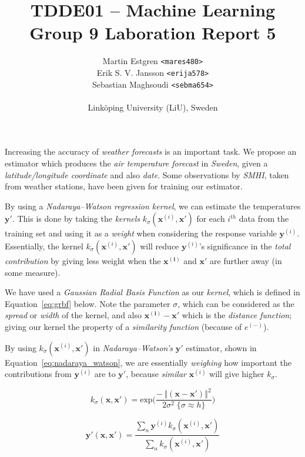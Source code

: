 \documentclass[a4paper, twocolumn]{article}
\title{TDDE01 -- Machine Learning \\
Group 9 Laboration Report 5}
\author{{Martin Estgren \texttt{<mares480>}} \\
{Erik S. V. Jansson \texttt{<erija578>}} \\
{Sebastian Maghsoudi \texttt{<sebma654>}} \\~\\
{Linköping University (LiU), Sweden}}
\begin{document}
    \maketitle %

    Increasing the accuracy of \emph{weather forecasts} is an important task. We propose an estimator which produces the \emph{air temperature forecast} in \emph{Sweden}, given a \emph{latitude/longitude coordinate} and also \emph{date}. Some observations by \emph{SMHI}, taken from weather stations, have been given for training our estimator.

    By using a \emph{Nadaraya–Watson regression kernel}, we can estimate the temperatures \(\bm{y'}\). This is done by taking the \emph{kernels} \(k_\sigma(\bm{x}^{(i)}, \bm{x'})\) for each \(i^{th}\) data from the training set and using it as a \emph{weight} when considering the response variable \(\bm{y}^{(i)}\). Essentially, the kernel \(k_\sigma(\bm{x}^{(i)}, \bm{x'})\) will reduce \(\bm{y}^{(i)}\)'s significance in the \emph{total contribution} by giving less weight when the \(\bm{x^{(i)}}\) and \(\bm{x'}\) are further away (in some measure).

    We have used a \emph{Gaussian Radial Basis Function} as our \emph{kernel}, which is defined in Equation~\ref{eq:grbf} below. Note the parameter \(\sigma\), which can be considered as the \emph{spread} or \emph{width} of the kernel, and also \(\bm{x^{(i)}} - \bm{x'}\) which is the \emph{distance function}; giving our kernel the property of a \emph{similarity function} (because of \(e^{(\cdots)}\)).

    By using \(k_\sigma(\bm{x}^{(i)}, \bm{x'})\) in \emph{Nadaraya–Watson's} \(\bm{y'}\) estimator, shown in Equation~\ref{eq:nadaraya_watson}, we are essentially \emph{weighing} how important the contributions from \(\bm{y}^{(i)}\) are to \(\bm{y'}\), because \emph{similar} \(\bm{x}^{(i)}\) will give higher \(k_\sigma\).

    \begin{equation} \label{eq:grbf}
    k_\sigma(\bm{x}, \bm{x'}) = \mathrm{exp}\bigg(\frac{- \, {\left\Vert(\bm{x} - \bm{x'}) \right\Vert}^2}
    {2\sigma^2 \; \{\sigma \approx h\}}\bigg)
    \end{equation}

    \begin{equation} \label{eq:nadaraya_watson}
    \bm{y'}(\bm{x}, \bm{x'}) = \frac{\sum_n{\bm{y}^{(i)}k_\sigma(\bm{x}^{(i)}, \bm{x'})}}
    {\sum_n{k_\sigma(\bm{x}^{(i)}, \bm{x'})}}
    \end{equation}
\end{document}
